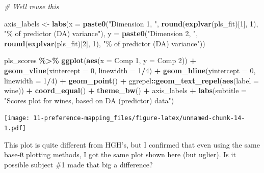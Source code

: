 \documentclass[
]{book}
\newenvironment{Shaded}{\begin{snugshade}}{\end{snugshade}}
\newcommand{\AttributeTok}[1]{\textcolor[rgb]{0.13,0.29,0.53}{#1}}
\newcommand{\CommentTok}[1]{\textcolor[rgb]{0.56,0.35,0.01}{\textit{#1}}}
\newcommand{\DecValTok}[1]{\textcolor[rgb]{0.00,0.00,0.81}{#1}}
\newcommand{\FunctionTok}[1]{\textcolor[rgb]{0.13,0.29,0.53}{\textbf{#1}}}
\newcommand{\NormalTok}[1]{#1}
\newcommand{\OtherTok}[1]{\textcolor[rgb]{0.56,0.35,0.01}{#1}}
\newcommand{\SpecialCharTok}[1]{\textcolor[rgb]{0.81,0.36,0.00}{\textbf{#1}}}
\newcommand{\StringTok}[1]{\textcolor[rgb]{0.31,0.60,0.02}{#1}}
\begin{document}
\begin{Shaded}
\begin{Highlighting}[]
\CommentTok{\# We\textquotesingle{}ll reuse this}

\NormalTok{axis\_labels }\OtherTok{\textless{}{-}} 
  \FunctionTok{labs}\NormalTok{(}\AttributeTok{x =} \FunctionTok{paste0}\NormalTok{(}\StringTok{"Dimension 1, "}\NormalTok{, }\FunctionTok{round}\NormalTok{(}\FunctionTok{explvar}\NormalTok{(pls\_fit)[}\DecValTok{1}\NormalTok{], }\DecValTok{1}\NormalTok{), }\StringTok{"\% of predictor (DA) variance"}\NormalTok{),}
       \AttributeTok{y =} \FunctionTok{paste0}\NormalTok{(}\StringTok{"Dimension 2, "}\NormalTok{, }\FunctionTok{round}\NormalTok{(}\FunctionTok{explvar}\NormalTok{(pls\_fit)[}\DecValTok{2}\NormalTok{], }\DecValTok{1}\NormalTok{), }\StringTok{"\% of predictor (DA) variance"}\NormalTok{))}

\NormalTok{pls\_scores }\SpecialCharTok{\%\textgreater{}\%}
  \FunctionTok{ggplot}\NormalTok{(}\FunctionTok{aes}\NormalTok{(}\AttributeTok{x =} \StringTok{\textasciigrave{}}\AttributeTok{Comp 1}\StringTok{\textasciigrave{}}\NormalTok{, }\AttributeTok{y =} \StringTok{\textasciigrave{}}\AttributeTok{Comp 2}\StringTok{\textasciigrave{}}\NormalTok{)) }\SpecialCharTok{+} 
  \FunctionTok{geom\_vline}\NormalTok{(}\AttributeTok{xintercept =} \DecValTok{0}\NormalTok{, }\AttributeTok{linewidth =} \DecValTok{1}\SpecialCharTok{/}\DecValTok{4}\NormalTok{) }\SpecialCharTok{+} 
  \FunctionTok{geom\_hline}\NormalTok{(}\AttributeTok{yintercept =} \DecValTok{0}\NormalTok{, }\AttributeTok{linewidth =} \DecValTok{1}\SpecialCharTok{/}\DecValTok{4}\NormalTok{) }\SpecialCharTok{+} 
  \FunctionTok{geom\_point}\NormalTok{() }\SpecialCharTok{+} 
\NormalTok{  ggrepel}\SpecialCharTok{::}\FunctionTok{geom\_text\_repel}\NormalTok{(}\FunctionTok{aes}\NormalTok{(}\AttributeTok{label =}\NormalTok{ wine)) }\SpecialCharTok{+} 
  \FunctionTok{coord\_equal}\NormalTok{() }\SpecialCharTok{+}
  \FunctionTok{theme\_bw}\NormalTok{() }\SpecialCharTok{+}
\NormalTok{  axis\_labels }\SpecialCharTok{+} 
  \FunctionTok{labs}\NormalTok{(}\AttributeTok{subtitle =} \StringTok{"Scores plot for wines, based on DA (predictor) data"}\NormalTok{)}
\end{Highlighting}
\end{Shaded}

\texttt{[image: 11-preference-mapping\_files/figure-latex/unnamed-chunk-14-1.pdf]}

This plot is quite different from HGH's, but I confirmed that even using the same base-\texttt{R} plotting methods, I got the same plot shown here (but uglier). Is it possible subject \#1 made that big a difference?
\end{document}
